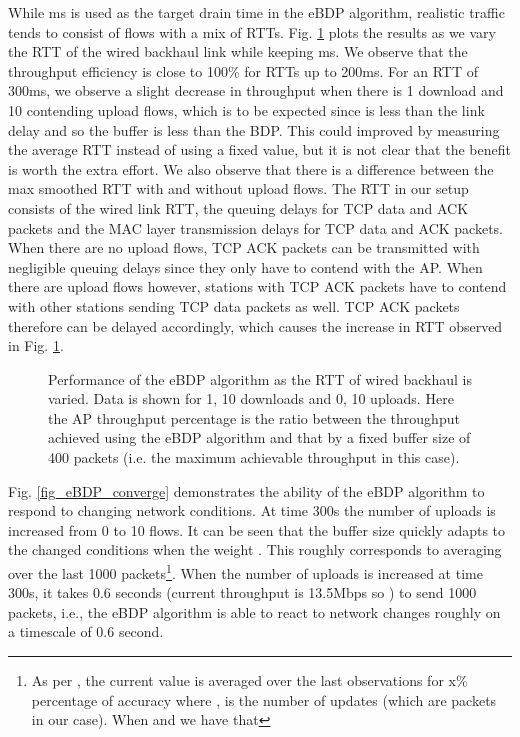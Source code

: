 \documentclass[10pt,twocolumn, journal]{IEEEtran}
\begin{document}
While ms is used as the target drain time in the eBDP algorithm, realistic
traffic tends to consist of flows with a mix of RTTs. Fig. \ref{fig_eBDP_varyrtt} plots
the results as we vary the RTT of the wired backhaul link while keeping ms.
We observe that the throughput efficiency is close to 100\% for RTTs up to 200ms. For an RTT of 300ms, we observe a slight decrease in throughput when there is 1 download and 10
contending upload flows, which is to be expected since  is less than the link
delay and so the buffer is less than the BDP. This could improved by measuring the
average RTT instead of using a fixed value, but it is not clear that the benefit is worth
the extra effort. We also observe that there is a difference between the max smoothed RTT
with and without upload flows. The RTT in our setup consists of the wired link RTT, the
queuing delays for TCP data and ACK packets and the MAC layer transmission delays for
TCP data and ACK packets. When there are no upload flows, TCP ACK packets can be
transmitted with negligible queuing delays since they only have to contend with the AP.
When there are upload flows however, stations with TCP ACK packets have to contend with
other stations sending TCP data packets as well. TCP ACK packets therefore can be delayed
accordingly, which causes the increase in RTT observed in Fig. \ref{fig_eBDP_varyrtt}.


\begin{figure}[tb]
   \centering
   \caption{Performance of the eBDP algorithm as the RTT of wired backhaul is varied.
   Data is shown for 1, 10 downloads and 0, 10 uploads.    Here the AP throughput percentage is the ratio between the throughput achieved using the eBDP algorithm and that by a fixed buffer size of 400 packets (i.e. the maximum achievable throughput in this case).}
   \label{fig_eBDP_varyrtt}
\end{figure}


Fig. \ref{fig_eBDP_converge} demonstrates the ability of the eBDP algorithm to respond to
changing network conditions.   At time 300s the number of uploads is increased from 0 to
10 flows.  It can be seen that the buffer size quickly adapts to the changed conditions
when the weight . This roughly corresponds to averaging over the last 1000
packets\footnote{As per \cite{Chatfield_2004}, the current value is averaged over the
last  observations for x\% percentage of accuracy where ,  is the
number of updates (which are packets in our case). When  and  we have
that }. When the number of uploads is increased at time 300s, it takes 0.6
seconds (current throughput is 13.5Mbps so ) to send 1000
packets, i.e., the eBDP algorithm is able to react to network changes roughly on a
timescale of 0.6 second.
\end{document}
